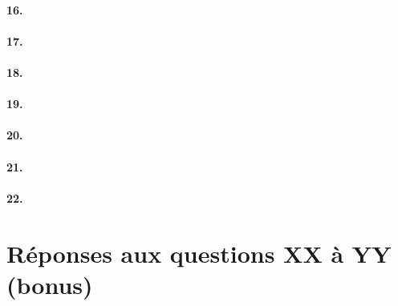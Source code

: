 \documentclass[10pt]{article}
\begin{document}
        \paragraph{16.}
        
        \paragraph{17.}
        
        \paragraph{18.}
        
        \paragraph{19.}
        
        \paragraph{20.}
        
        \paragraph{21.}
        
        \paragraph{22.}

    \section{Réponses aux questions XX à YY (bonus)}
\end{document}
